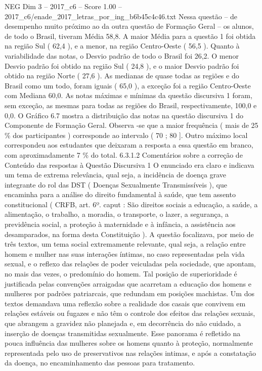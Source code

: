 \begin{textsample}{NEG Dim 3 – 2017\_c6 – Score 1.00 – 2017\_c6/enade\_2017\_letras\_por\_ing\_b6b45c4c46.txt}
Nessa questão – de desempenho muito próximo ao da outra questão de Formação Geral – os alunos, de todo o Brasil, tiveram Média 58,8.
A maior Média para a questão 1 foi obtida na região Sul ( 62,4 ), e a menor, na região Centro-Oeste ( 56,5 ).
Quanto à variabilidade das notas, o Desvio padrão de todo o Brasil foi 26,2.
O menor Desvio padrão foi obtido na região Sul ( 24,8 ), e o maior Desvio padrão foi obtido na região Norte ( 27,6 ).
As medianas de quase todas as regiões e do Brasil como um todo, foram iguais ( 65,0 ), a exceção foi a região Centro-Oeste com Mediana 60,0.
As notas máximas e mínimas da questão discursiva 1 foram, sem exceção, as mesmas para todas as regiões do Brasil, respectivamente, 100,0 e 0,0.
O Gráfico 6.7 mostra a distribuição das notas na questão discursiva 1 do Componente de Formação Geral.
Observa -se que a maior frequência ( mais de 25 \% dos participantes ) corresponde ao intervalo ( 70 ; 80 ].
Outro máximo local correspondeu aos estudantes que deixaram a resposta a essa questão em branco, com aproximadamente 7 \% do total. 6.3.1.2 Comentários sobre a correção de Conteúdo das respostas à Questão Discursiva 1 O enunciado era claro e indicava um tema de extrema relevância, qual seja, a incidência de doença grave integrante do rol das DST ( Doenças Sexualmente Transmissíveis ), que encaminha para a análise do direito fundamental à saúde, que tem assento constitucional ( CRFB, art. 6º. caput : São direitos sociais a educação, a saúde, a alimentação, o trabalho, a moradia, o transporte, o lazer, a segurança, a previdência social, a proteção à maternidade e à infância, a assistência aos desamparados, na forma desta Constituição ).
A questão focalizava, por meio de três textos, um tema social extremamente relevante, qual seja, a relação entre homem e mulher nas suas interações íntimas, no caso representadas pela vida sexual, e o reflexo das relações de poder veiculadas pela sociedade, que apontam, no mais das vezes, o predomínio do homem.
Tal posição de superioridade é justificada pelas convenções arraigadas que acarretam a educação dos homens e mulheres por padrões patriarcais, que redundam em posições machistas.
Um dos textos demandava uma reflexão sobre a realidade dos casais que convivem em relações estáveis ou fugazes e não têm o controle dos efeitos das relações sexuais, que abrangem a gravidez não planejada e, em decorrência do não cuidado, a inserção de doenças transmitidas sexualmente.
Esse panorama é refletido na pouca influência das mulheres sobre os homens quanto à proteção, normalmente representada pelo uso de preservativos nas relações intimas, e após a constatação da doença, no encaminhamento das pessoas para tratamento.

\end{textsample}
